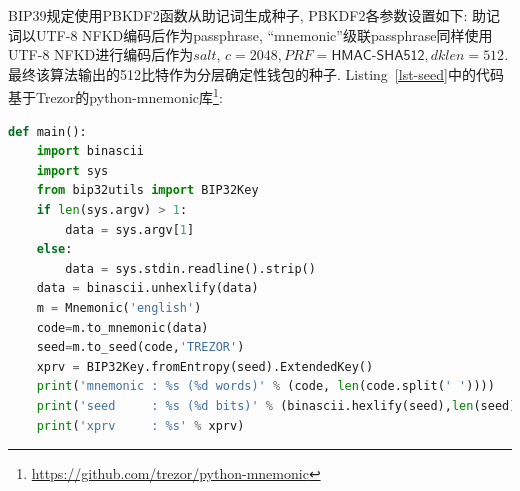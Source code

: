 
BIP39规定使用\textsf{PBKDF2}函数从助记词生成种子, \textsf{PBKDF2}各参数设置如下:
助记词以UTF-8 NFKD编码后作为passphrase,
“mnemonic”级联passphrase同样使用UTF-8 NFKD进行编码后作为$salt$,
$c=2048, PRF=\textsf{HMAC-SHA512}, dklen=512$.
最终该算法输出的512比特作为分层确定性钱包的种子.
Listing~\ref{lst-seed}中的代码基于Trezor的python-mnemonic库\footnote{\url{https://github.com/trezor/python-mnemonic}}:

\begin{lstlisting}[language=python, caption=想一个名字函数重命名执行结果展示, label=lst-seed]
def main():
    import binascii
    import sys
    from bip32utils import BIP32Key
    if len(sys.argv) > 1:
        data = sys.argv[1]
    else:
        data = sys.stdin.readline().strip()
    data = binascii.unhexlify(data)
    m = Mnemonic('english')
    code=m.to_mnemonic(data)
    seed=m.to_seed(code,'TREZOR')
    xprv = BIP32Key.fromEntropy(seed).ExtendedKey()
    print('mnemonic : %s (%d words)' % (code, len(code.split(' '))))
    print('seed     : %s (%d bits)' % (binascii.hexlify(seed),len(seed) * 4))
    print('xprv     : %s' % xprv)
\end{lstlisting}

